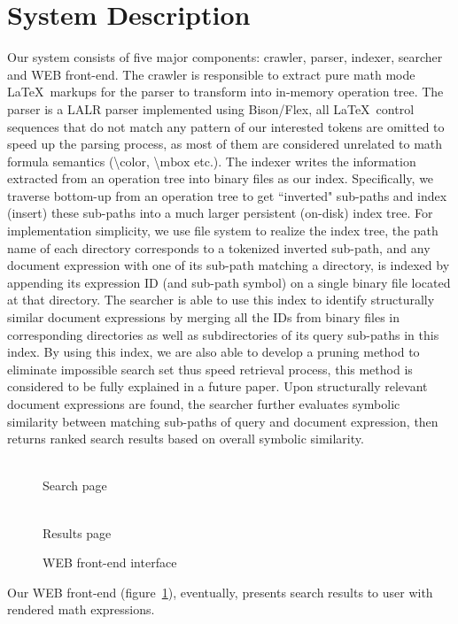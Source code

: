 \documentclass{llncs}
\begin{document}
\section{System Description}
Our system consists of five major components: crawler, parser, indexer, searcher and WEB front-end.
The crawler is responsible to extract pure math mode \LaTeX\ markups for the parser to transform into in-memory operation tree. 
The parser is a LALR parser implemented using Bison/Flex, all \LaTeX\ control sequences that do not match any pattern of our interested tokens are omitted to speed up the parsing process, 
as most of them are considered unrelated to math formula semantics (\textbackslash$\text{color}$, \textbackslash$\text{mbox}$ etc.).
The indexer writes the information extracted from an operation tree into binary files as our index. 
Specifically, we traverse bottom-up from an operation tree to get ``inverted" sub-paths and index (insert) these sub-paths into a much larger persistent (on-disk) index tree.
For implementation simplicity, we use file system to realize the index tree, the path name of each directory corresponds to a tokenized inverted sub-path, 
and any document expression with one of its sub-path matching a directory, is indexed by appending its expression ID (and sub-path symbol) on a single binary file located at that directory.
The searcher is able to use this index to identify structurally similar document expressions by merging all the IDs from binary files in corresponding directories as well as subdirectories of its query sub-paths in this index.
By using this index, we are also able to develop a pruning method to eliminate impossible search set thus speed retrieval process, 
this method is considered to be fully explained in a future paper.
Upon structurally relevant document expressions are found, the searcher further evaluates symbolic similarity between matching sub-paths of query and document expression, then returns ranked search results based on overall symbolic similarity.
\begin{figure}
\begin{minipage}[b]{2.10in}
\begin{center}
\\ Search page
\end{center}
\end{minipage}
\hspace*{0in}
\begin{minipage}[b]{2.20in}
\begin{center}
\\ Results page
\end{center}
\end{minipage}
\caption{WEB front-end interface}\label{frontEnd}
\end{figure}
Our WEB front-end (figure~\ref{frontEnd}), eventually, presents search results to user with rendered math expressions.
\end{document}
